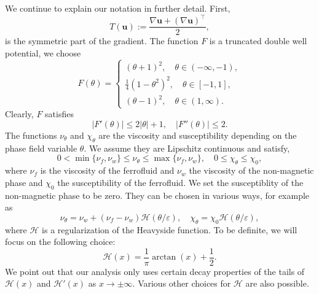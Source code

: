 \documentclass[10pt,letterpaper,twoside]{amsart}
\theoremstyle{definition}{\newtheorem{definition}[lemma]{Definition}}
\theoremstyle{note}{\newtheorem{claim}{Claim}[section]
\newtheorem*{claim*}{Claim}}
\numberwithin{equation}{section}
\newcommand{\eps}{\varepsilon}
\newcommand{\Grad}{\nabla}
\newcommand{\bu}{\mathbf{u}}
\begin{document}
We continue to explain our notation in further detail. First,
\begin{equation}
	\label{eq:symgradient}
	T(\bu):= \frac{\Grad \bu + (\Grad \bu)^\top}{2},
\end{equation}
is the symmetric part of the gradient. 
The function $F$ is a truncated double well potential, we choose
\begin{equation*}
	F(\theta)= \begin{cases}
		(\theta+1)^2,\quad \theta\in (-\infty,-1),\\
		\frac{1}{4}(1-\theta^2)^2,\quad \theta\in [-1,1],\\
		(\theta-1)^2,\quad \theta\in (1,\infty).
	\end{cases}
\end{equation*}
Clearly, $F$ satisfies
\begin{equation}\label{eq:Fass}
	|F'(\theta)|\leq 2|\theta|+1,\quad |F''(\theta)|\leq 2.
\end{equation}
The functions $\nu_\theta$ and $\chi_\theta$ are the viscosity and susceptibility depending on the phase field variable $\theta$. We assume they are Lipschitz continuous and satisfy,
\begin{equation}\label{eq:viscosity}
	0<\min\{\nu_f,\nu_w\}\leq \nu_\theta\leq \max\{\nu_f,\nu_w\},\quad 0\leq \chi_\theta\leq \chi_0,
\end{equation}
where $\nu_f$ is the viscosity of the ferrofluid and $\nu_w$ the viscosity of the non-magnetic phase and $\chi_0$ the susceptibility of the ferrofluid. We set the susceptiblity of the non-magnetic phase to be zero. They can be chosen in various ways, for example as 
\begin{equation}\label{eq:chidef}
	\nu_\theta= \nu_w +(\nu_f-\nu_w)\mathcal{H}(\theta/\eps),\quad \chi_\theta = \chi_0\mathcal{H}(\theta/\eps),
\end{equation}
 where $\mathcal{H}$ is a regularization of the Heavyside function. To be definite, we will focus on the following choice:
\begin{equation}\label{eq:heavyside}
\mathcal{H}(x) = \frac{1}{\pi} \arctan(x) + \frac 12.
\end{equation}
We point out that our analysis only uses certain decay properties of the tails of $\mathcal{H}(x)$ and $\mathcal{H}'(x)$ as $x\to \pm\infty$. Various other choices for $\mathcal{H}$ are also possible.
\end{document}
